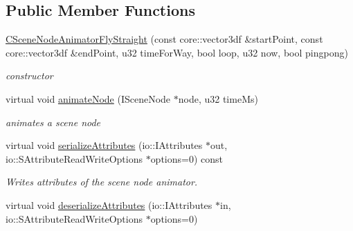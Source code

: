 \subsection*{Public Member Functions}
\begin{DoxyCompactItemize}
\item 
\hypertarget{classirr_1_1scene_1_1_c_scene_node_animator_fly_straight_ac2d98e4d54fad30a3338246873370ea9}{\hyperlink{classirr_1_1scene_1_1_c_scene_node_animator_fly_straight_ac2d98e4d54fad30a3338246873370ea9}{C\-Scene\-Node\-Animator\-Fly\-Straight} (const core\-::vector3df \&start\-Point, const core\-::vector3df \&end\-Point, u32 time\-For\-Way, bool loop, u32 now, bool pingpong)}\label{classirr_1_1scene_1_1_c_scene_node_animator_fly_straight_ac2d98e4d54fad30a3338246873370ea9}

\begin{DoxyCompactList}\small\item\em constructor \end{DoxyCompactList}\item 
\hypertarget{classirr_1_1scene_1_1_c_scene_node_animator_fly_straight_a7ecf57c108a3923c9a9884ab695fe0e1}{virtual void \hyperlink{classirr_1_1scene_1_1_c_scene_node_animator_fly_straight_a7ecf57c108a3923c9a9884ab695fe0e1}{animate\-Node} (I\-Scene\-Node $\ast$node, u32 time\-Ms)}\label{classirr_1_1scene_1_1_c_scene_node_animator_fly_straight_a7ecf57c108a3923c9a9884ab695fe0e1}

\begin{DoxyCompactList}\small\item\em animates a scene node \end{DoxyCompactList}\item 
\hypertarget{classirr_1_1scene_1_1_c_scene_node_animator_fly_straight_aabd2a43739e938430ee7513e2f20fa6c}{virtual void \hyperlink{classirr_1_1scene_1_1_c_scene_node_animator_fly_straight_aabd2a43739e938430ee7513e2f20fa6c}{serialize\-Attributes} (io\-::\-I\-Attributes $\ast$out, io\-::\-S\-Attribute\-Read\-Write\-Options $\ast$options=0) const }\label{classirr_1_1scene_1_1_c_scene_node_animator_fly_straight_aabd2a43739e938430ee7513e2f20fa6c}

\begin{DoxyCompactList}\small\item\em Writes attributes of the scene node animator. \end{DoxyCompactList}\item 
\hypertarget{classirr_1_1scene_1_1_c_scene_node_animator_fly_straight_a5d9b0d2fc78fbf805760ded12e08cd04}{virtual void \hyperlink{classirr_1_1scene_1_1_c_scene_node_animator_fly_straight_a5d9b0d2fc78fbf805760ded12e08cd04}{deserialize\-Attributes} (io\-::\-I\-Attributes $\ast$in, io\-::\-S\-Attribute\-Read\-Write\-Options $\ast$options=0)}\label{classirr_1_1scene_1_1_c_scene_node_animator_fly_straight_a5d9b0d2fc78fbf805760ded12e08cd04}


\end{DoxyCompactItemize}

